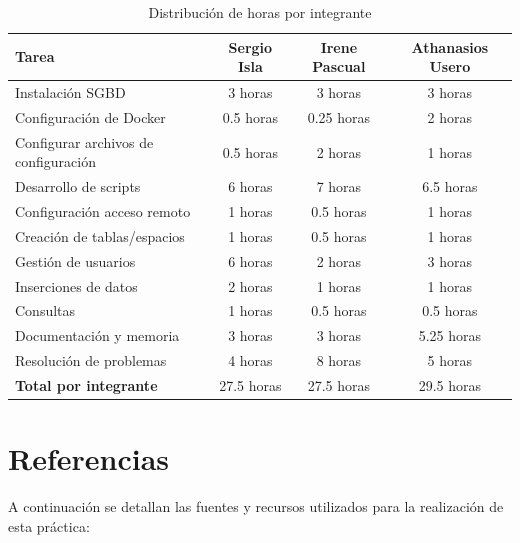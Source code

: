 \documentclass{article}
\begin{document}
\begin{table}[H]
    \centering
    \caption{Distribución de horas por integrante}
    \label{tab:esfuerzos}
    \begin{tabular}{|l|c|c|c|}
    \hline
    \textbf{Tarea} & \textbf{Sergio Isla} & \textbf{Irene Pascual} & \textbf{Athanasios Usero} \\ \hline
    Instalación SGBD & 3 horas & 3 horas & 3 horas \\ \hline
    Configuración de Docker & 0.5 horas & 0.25 horas & 2 horas \\ \hline
    Configurar archivos de configuración & 0.5 horas & 2 horas & 1 horas \\ \hline
    Desarrollo de scripts & 6 horas & 7 horas & 6.5 horas \\ \hline
    Configuración acceso remoto & 1 horas & 0.5 horas & 1 horas \\ \hline
    Creación de tablas/espacios & 1 horas & 0.5 horas & 1 horas \\ \hline
    Gestión de usuarios & 6 horas & 2 horas & 3 horas \\ \hline
    Inserciones de datos & 2 horas & 1 horas & 1 horas \\ \hline
    Consultas & 1 horas & 0.5 horas & 0.5 horas \\ \hline
    Documentación y memoria & 3 horas & 3 horas & 5.25 horas \\ \hline
    Resolución de problemas & 4 horas & 8 horas & 5 horas \\ \hline \hline
    \textbf{Total por integrante} & 27.5 horas & 27.5 horas & 29.5 horas \\ \hline
    \end{tabular}
    \end{table}
    
\newpage

\section{Referencias}

A continuación se detallan las fuentes y recursos utilizados para la realización de esta práctica:
\end{document}
